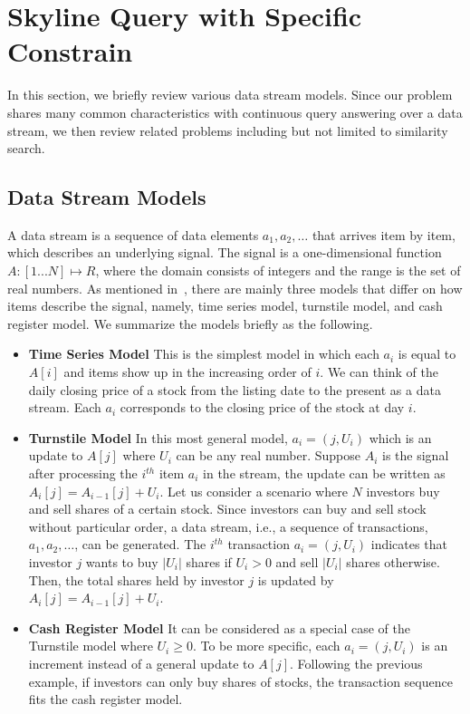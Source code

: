 \section{Skyline Query with Specific Constrain}
\label{sec:rel:constrain}
In this section, we briefly review various data stream models. Since our problem shares many common characteristics with continuous query answering over a data stream, we then review related problems including but not limited to similarity search.  

\subsection{Data Stream Models}
A data stream is a sequence of data elements $a_1, a_2, \dots$ that arrives item by item, which describes an underlying signal. The signal is a one-dimensional function $A: [1...N] \mapsto R$, where the domain consists of integers and the range is the set of real numbers. As mentioned in~\cite{muthukrishnan05}, there are mainly three models that differ on how items describe the signal, namely, time series model, turnstile model, and cash register model. We summarize the models briefly as the following.  

\begin{itemize}
\item \textbf{Time Series Model} This is the simplest model in which each $a_i$ is equal to $A[i]$ and items show up in the increasing order of $i$. We can think of the daily closing price of a stock from the listing date to the present as a data stream. Each $a_i$ corresponds to the closing price of the stock at day $i$.          

\item \textbf{Turnstile Model} In this most general model, $a_i = (j, U_i)$ which is an update to $A[j]$ where $U_i$ can be any real number. Suppose $A_i$ is the signal after processing the $i^{th}$ item $a_i$ in the stream, the update can be written as $A_i[j] = A_{i-1}[j] + U_i$. Let us consider a scenario where $N$ investors buy and sell shares of a certain stock. Since investors can buy and sell stock without particular order, a data stream, i.e., a sequence of transactions, $a_1, a_2, \dots$, can be generated. The $i^{th}$ transaction $a_i = (j, U_i)$ indicates that investor $j$ wants to buy $|U_i|$ shares if $U_i > 0$ and sell $|U_i|$ shares otherwise. Then, the total shares held by investor $j$ is updated by $A_i[j] = A_{i-1}[j] + U_i$.       

\item \textbf{Cash Register Model} It can be considered as a special case of the Turnstile model where $U_i \geq 0$. To be more specific, each $a_i=(j, U_i)$ is an increment instead of a general update to $A[j]$. Following the previous example, if investors can only buy shares of stocks, the transaction sequence fits the cash register model. 

\end{itemize}

